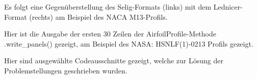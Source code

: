 \appendix

\label{appendix:a}

Es folgt eine Gegenüberstellung des Selig-Formats (links) mit dem Lednicer-Format (rechts) am Beispiel des NACA M13-Profils.

\begin{minipage}{0.45\textwidth}

\end{minipage}
    \hfill
\begin{minipage}{0.45\textwidth}

\end{minipage}

\newpage
{}
\label{appendix:b}
Hier ist die Ausgabe der ersten 30 Zeilen der AirfoilProfile-Methode .write\_panels() gezeigt, am Beispiel des NASA: HSNLF(1)-0213 Profils gezeigt.



\newpage
{}
\label{appendix:c}
Hier sind ausgewählte Codeausschnitte gezeigt, welche zur Lösung der Problemstellungen geschrieben wurden.
